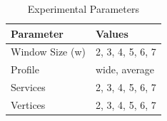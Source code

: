     \begin{table}
      \caption{Experimental Parameters}
      \label{tab:parameters}
      \centering
      {\color{OurColor2}
      \begin{tabular}{l|l}
        \textbf{Parameter}                  & \textbf{Values}  \\
        \hline
        Window Size (\textbar{}w\textbar{}) & 2, 3, 4, 5, 6, 7 \\
        Profile                             & wide, average    \\
        Services                            & 2, 3, 4, 5, 6, 7 \\
        Vertices                            & 2, 3, 4, 5, 6, 7 \\
      \end{tabular}
      }
    \end{table}

